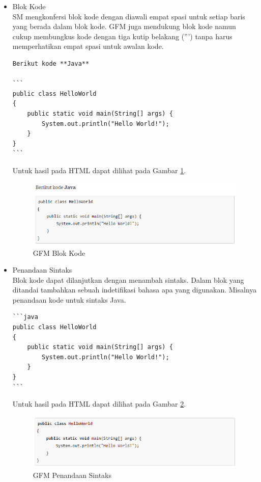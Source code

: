 \begin{itemize}
\item Blok Kode\\
SM mengkonfersi blok kode dengan diawali empat spasi untuk setiap baris yang berada dalam blok kode. GFM juga mendukung blok kode namun cukup membungkus kode dengan tiga kutip belakang (''') tanpa harus memperhatikan empat spasi untuk awalan kode.
\begin{lstlisting}[basicstyle=\footnotesize]
Berikut kode **Java**

```
public class HelloWorld
{
	public static void main(String[] args) {
		System.out.println("Hello World!");
	}
}
```
\end{lstlisting}
Untuk hasil pada HTML dapat dilihat pada Gambar \ref{fig:blokkode}.
\begin{figure}[H]
\centering
\includegraphics[scale=0.6]{Gambar/blokkode.png}
\caption[GFM Blok Kode]{GFM Blok Kode}
\label{fig:blokkode}
\end{figure}

\item Penandaan Sintaks\\
Blok kode dapat dilanjutkan dengan menambah sintaks. Dalam blok yang ditandai tambahkan sebuah indetifikasi bahasa apa yang digunakan. Misalnya penandaan kode untuk sintaks Java.
\begin{lstlisting}[basicstyle=\footnotesize]
```java
public class HelloWorld
{
	public static void main(String[] args) {
		System.out.println("Hello World!");
	}
}
```
\end{lstlisting}
Untuk hasil pada HTML dapat dilihat pada Gambar \ref{fig:ruby}.
\begin{figure}[H]
\centering
\includegraphics[scale=0.6]{Gambar/java.png}
\caption[GFM Penandaan Sintaks]{GFM Penandaan Sintaks}
\label{fig:ruby}
\end{figure}


\end{itemize}
